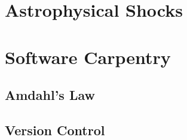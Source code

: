 \chapter{Astrophysical Shocks}

\chapter{Software Carpentry}

\section{Amdahl's Law}

\section{Version Control}